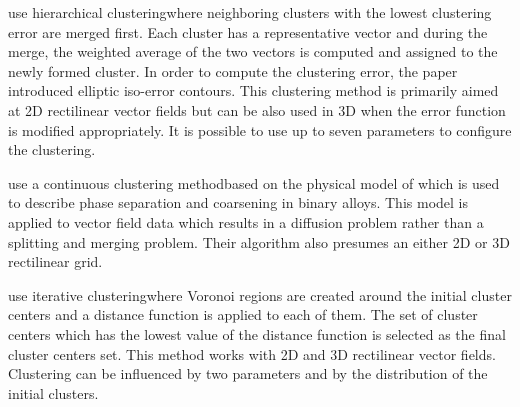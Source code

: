 \citet{Telea99} use hierarchical clustering\footnotemark where neighboring clusters with the lowest clustering error are merged first. Each cluster has a representative vector and during the merge, the weighted average of the two vectors is computed and assigned to the newly formed cluster. In order to compute the clustering error, the paper introduced elliptic iso-error contours\footnotemark. This clustering method is primarily aimed at 2D rectilinear vector fields but can be also used in 3D when the error function is modified appropriately. It is possible to use up to seven parameters to configure the clustering.



\citet{Garcke00} use a continuous clustering method\footnotemark based on the physical model of \citet{CahnHilliard58} which is used to describe phase separation and coarsening in binary alloys. This model is applied to vector field data which results in a diffusion problem rather than a splitting and merging problem. Their algorithm also presumes an either 2D or 3D rectilinear grid.


\citet{Du04} use iterative clustering\footnotemark where Voronoi regions are created around the initial cluster centers and a distance function is applied to each of them. The set of cluster centers which has the lowest value of the distance function is selected as the final cluster centers set. This method works with 2D and 3D rectilinear vector fields. Clustering can be influenced by two parameters and by the distribution of the initial clusters.


